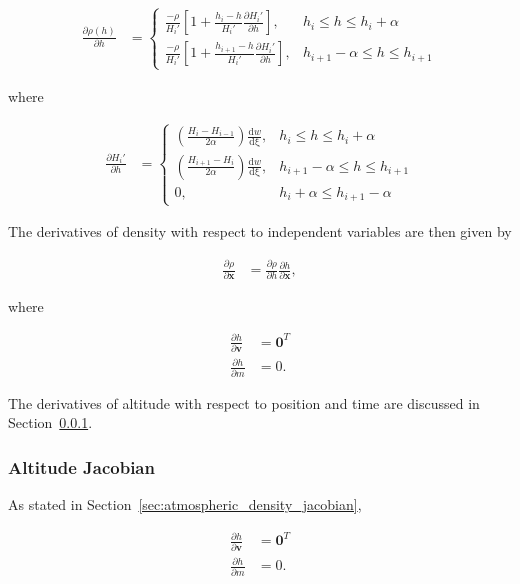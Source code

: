 \documentclass[]{article}
\newcommand{\vb}[1]{\bm{#1}} %
\newcommand{\pd}[2]{\frac{\partial #1}{\partial #2}} %
\begin{document}
\begin{align}
	\pd{\rho (h)}{h} &= \begin{cases}
	\frac{- \rho}{H_i'} \left[ 1 + \frac{h_i - h}{H_i'} \pd{H_i'}{h} \right], & h_i \leq h \leq h_i + \alpha \\
	\frac{- \rho}{H_i'} \left[ 1 + \frac{h_{i+1} - h}{H_i'} \pd{H_i'}{h} \right], &h_{i+1} - \alpha \leq h \leq h_{i+1}
	\end{cases}
\end{align}

\noindent where

\begin{align}
	\pd{H_i'}{h} &= \begin{cases}
	\left( \frac{H_i - H_{i-1}}{2 \alpha} \right) \frac{\mathrm{d} w}{\mathrm{d \xi}}, & h_i \leq h \leq h_i + \alpha \\
	\left( \frac{H_{i+1} - H_{i}}{2 \alpha} \right) \frac{\mathrm{d} w}{\mathrm{d \xi}}, & h_{i+1} - \alpha \leq h \leq h_{i+1} \\
	0, & h_i + \alpha \leq h_{i+1} - \alpha
	\end{cases}
\end{align}

The derivatives of density with respect to independent variables are then given by

\begin{align}
	\pd{\rho}{\vb{x}} &= \pd{\rho}{h} \pd{h}{\vb{x}},
\end{align}

\noindent where

\begin{align}
	\pd{h}{\vb{v}} &= \vb{0}^T \\
	\pd{h}{m} &= 0.
\end{align}

\noindent The derivatives of altitude with respect to position and time are discussed in Section~\ref{sec:altitude_jacobian}.

\subsubsection{Altitude Jacobian}
\label{sec:altitude_jacobian}

As stated in Section~\ref{sec:atmospheric_density_jacobian},

\begin{align}
	\pd{h}{\vb{v}} &= \vb{0}^T \\
	\pd{h}{m} &= 0.
\end{align}
\end{document}
